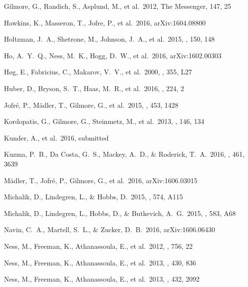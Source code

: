 \documentclass[preprint,trackchanges]{aastex}
\begin{document}
\begin{thebibliography}{dummy}
 Gilmore, G., Randich, S., Asplund, M., et al.\ 2012, The Messenger, 147, 25

 Hawkins, K., Masseron, T., Jofre, P., et al.\ 2016, arXiv:1604.08800 

 Holtzman, J.~A., Shetrone, M., Johnson, J.~A., et al.\ 2015, \aj, 150, 148 

 Ho, A.~Y.~Q., Ness, M.~K., Hogg, D.~W., et al.\ 2016, arXiv:1602.00303 
 
 H{\o}g, E., Fabricius, C., Makarov, V.~V., et al.\ 2000, \aap, 355, L27 

 Huber, D., Bryson, S.~T., Haas, M.~R., et al.\ 2016, \apjs, 224, 2 

 Jofr{\'e}, P., M{\"a}dler, T., Gilmore, G., et al.\ 2015, \mnras, 453, 1428 

 Kordopatis, G., Gilmore, G., Steinmetz, M., et al.\ 2013, \aj, 146, 134 

 Kunder, A., et al.\ 2016, submitted

 Kuzma, P.~B., Da Costa, G.~S., Mackey, A.~D., \& Roderick, T.~A.\ 2016, \mnras, 461, 3639 

 M{\"a}dler, T., Jofr{\'e}, P., Gilmore, G., et al.\ 2016, arXiv:1606.03015 

 Michalik, D., Lindegren, L., \& Hobbs, D.\ 2015, \aap, 574, A115 

 Michalik, D., Lindegren, L., Hobbs, D., \& Butkevich, A.~G.\ 2015, \aap, 583, A68 

 Navin, C.~A., Martell, S.~L., \& Zucker, D.~B.\ 2016, arXiv:1606.06430 

 Ness, M., Freeman, K., Athanassoula, E., et al.\ 2012, \apj, 756, 22 

 Ness, M., Freeman, K., Athanassoula, E., et al.\ 2013, \mnras, 430, 836 

 Ness, M., Freeman, K., Athanassoula, E., et al.\ 2013, \mnras, 432, 2092 


\end{thebibliography}
\end{document}
